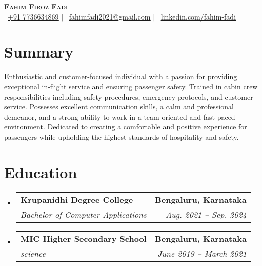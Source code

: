 \documentclass[a4paper,11pt]{article}
\makeatletter
\newcommand{\resumeSubheading}[4]{
	\vspace{-2pt}\item
		\begin{tabular*}{0.97\textwidth}[t]{l@{\extracolsep{\fill}}r}
			\textbf{#1} & \textbf{\small #2} \\
			\textit{\small#3} & \textit{\small #4} \\
		\end{tabular*}\vspace{-7pt}
}
\newcommand{\resumeSubHeadingListStart}{\begin{itemize}[leftmargin=0.15in, label={}]}
\newcommand{\resumeSubHeadingListEnd}{\end{itemize}}
\makeatother
\begin{document}
\begin{center}
	{\selectfont \textbf{\Huge \scshape{Fahim Firoz Fadi}}} \\ \vspace{1pt}
	\small{
		\raisebox{-0.1\height}\faPhone\ \href{tel:+917736634869}{\underline{+91 7736634869}} $|$
		\raisebox{-0.2\height}\faEnvelope\ \href{mailto:fahimfadi2021@gmail.com}{\underline{fahimfadi2021@gmail.com}} $|$
		\raisebox{-0.2\height}\faLinkedin\ \href{https://www.linkedin.com/in/fahim-fadi-816155310}{\underline{linkedin.com/fahim-fadi}}
	}
\end{center}

\section{Summary}
\begin{itemize}[leftmargin=0.15in, label={}]
	\small{\item{
		Enthusiastic and customer-focused individual with a passion for providing exceptional in-flight service and ensuring passenger safety. Trained in cabin crew responsibilities including safety procedures, emergency protocols, and customer service. Possesses excellent communication skills, a calm and professional demeanor, and a strong ability to work in a team-oriented and fast-paced environment. Dedicated to creating a comfortable and positive experience for passengers while upholding the highest standards of hospitality and safety.
				}}
\end{itemize}
\section{Education}
\resumeSubHeadingListStart
\resumeSubheading
{Krupanidhi Degree College}{Bengaluru, Karnataka}
{Bachelor of Computer Applications}{Aug. 2021 -- Sep. 2024}
\resumeSubheading
{MIC Higher Secondary School}{Bengaluru, Karnataka}
{science}{June 2019 -- March 2021}
\resumeSubHeadingListEnd

\end{document}
